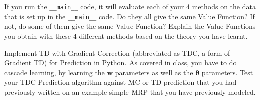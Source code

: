 \documentclass[12pt]{exam}
\begin{document}
\begin{questions}
If you run the \lstinline{__main__} code, it will evaluate each of your 4 methods on the data that is set up in the \lstinline{__main__} code. Do they all give the same Value Function? If not, do some of them give the same Value Function? Explain the Value Functions you obtain with these 4 different methods based on the theory you have learnt.

\question Implement TD with Gradient Correction (abbreviated as TDC, a form of Gradient TD) for Prediction in Python. As covered in class, you have to do cascade learning, by learning the $\bm{w}$ parameters as well as the $\bm{\theta}$ parameters. Test your TDC Prediction algorithm against MC or TD prediction that you had previously written on an example simple MRP that you have previously modeled.

\end{questions}
\end{document}
